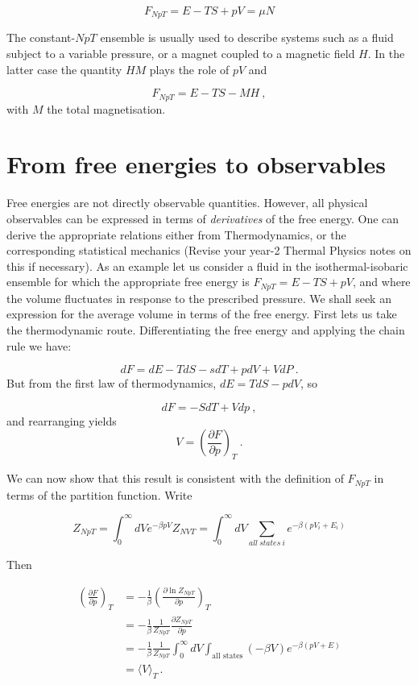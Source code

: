 \documentclass[
  letterpaper,
  DIV=11,
  numbers=noendperiod]{scrreprt}
\begin{document}
\[
F_{NpT}=E-TS+pV=\mu N
\]

The constant-\(NpT\) ensemble is usually used to describe systems such
as a fluid subject to a variable pressure, or a magnet coupled to a
magnetic field \(H\). In the latter case the quantity \(HM\) plays the
role of \(pV\) and

\[
F_{NpT}=E-TS-MH\:,
\] with \(M\) the total magnetisation.

\section*{From free energies to
observables}\label{from-free-energies-to-observables}


Free energies are not directly observable quantities. However, all
physical observables can be expressed in terms of \emph{derivatives} of
the free energy. One can derive the appropriate relations either from
Thermodynamics, or the corresponding statistical mechanics (Revise your
year-2 Thermal Physics notes on this if necessary). As an example let us
consider a fluid in the isothermal-isobaric ensemble for which the
appropriate free energy is \(F_{NpT}=E-TS+pV\), and where the volume
fluctuates in response to the prescribed pressure. We shall seek an
expression for the average volume in terms of the free energy. First
lets us take the thermodynamic route. Differentiating the free energy
and applying the chain rule we have:

\[
dF=dE-TdS-sdT+pdV+VdP\:.
\] But from the first law of thermodynamics, \(dE=TdS-pdV\), so

\[
dF=-SdT+Vdp\:,
\] and rearranging yields \[
V=\left(\frac{\partial F}{\partial p}\right)_T\:.
\]

We can now show that this result is consistent with the definition of
\(F_{NpT}\) in terms of the partition function. Write

\[
Z_{NpT}=\int_0^\infty dV  e^{-\beta p V}Z_{NVT}=\int_0^\infty dV\sum_{all~states~i}e^{-\beta (p V_i+E_i)}
\]

Then

\[
\begin{align}
\left(\frac{\partial F}{\partial p}\right)_T
&= -\frac{1}{\beta} \left(\frac{\partial \ln Z_{NpT}}{\partial p}\right)_T \\
&= -\frac{1}{\beta} \frac{1}{Z_{NpT}} \frac{\partial Z_{NpT}}{\partial p} \\
&= -\frac{1}{\beta} \frac{1}{Z_{NpT}} \int_0^\infty dV \int_{\text{all states}} (-\beta V) e^{-\beta (p V + E)} \\
&= \langle V \rangle_T \,.
\end{align}
\]
\end{document}
